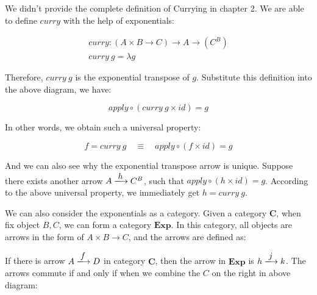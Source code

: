 \documentclass{article}
\begin{document}

We didn't provide the complete definition of Currying in chapter 2. We are able to define $curry$ with the help of exponentials:

\[
\begin{array}{l}
curry : (A \times B \to C) \to A \to (C^B) \\
curry\ g = \lambda g
\end{array}
\]

Therefore, $curry\ g$ is the exponential transpose of $g$. Substitute this definition into the above diagram, we have:

\[
  apply \circ (curry\ g \times id) = g
\]

In other words, we obtain such a universal property:

\[
  f = curry\ g \quad \equiv \quad apply \circ (f \times id) = g
\]

And we can also see why the exponential transpose arrow is unique. Suppose there exists another arrow $A \arrowto{h} C^B$, such that $apply \circ (h \times id) = g$. According to the above universal property, we immediately get $h = curry\ g$.

We can also consider the exponentials as a category. Given a category $\pmb{C}$, when fix object $B, C$, we can form a category $\pmb{Exp}$. In this category, all objects are arrows in the form of $A \times B \to C$, and the arrows are defined as:

\begin{center}
\end{center}

If there is arrow $A \arrowto{f} D$ in category $\pmb{C}$, then the arrow in $\pmb{Exp}$ is $h \arrowto{j} k$. The arrows commute if and only if when we combine the $C$ on the right in above diagram:

\begin{center}
\end{center}
\end{document}

